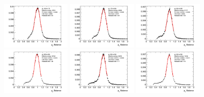 \begin{figure}[htb!]
    \centering
    \includegraphics[width=0.31\textwidth]{plots/insitu/fits_pythia_zee_nominal/Zeejet_Nominal_Bin2.png}
    \includegraphics[width=0.31\textwidth]{plots/insitu/fits_pythia_zee_nominal/Zeejet_Nominal_Bin3.png}
    \includegraphics[width=0.31\textwidth]{plots/insitu/fits_pythia_zee_nominal/Zeejet_Nominal_Bin4.png}
    \includegraphics[width=0.31\textwidth]{plots/insitu/fits_pythia_zee_nominal/Zeejet_Nominal_Bin5.png}
    \includegraphics[width=0.31\textwidth]{plots/insitu/fits_pythia_zee_nominal/Zeejet_Nominal_Bin6.png}
    \includegraphics[width=0.31\textwidth]{plots/insitu/fits_pythia_zee_nominal/Zeejet_Nominal_Bin7.png}

\end{figure}
